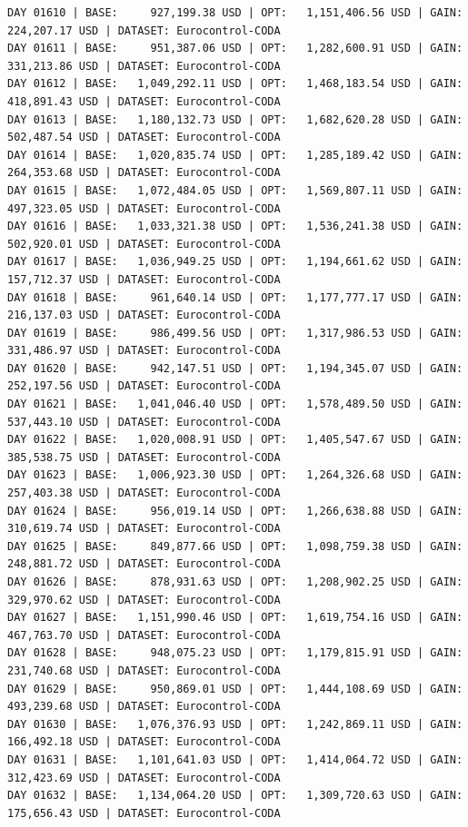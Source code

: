 \documentclass[11pt,a4paper]{article}
\begin{document}
\begin{verbatim}
DAY 01610 | BASE:     927,199.38 USD | OPT:   1,151,406.56 USD | GAIN: 224,207.17 USD | DATASET: Eurocontrol-CODA
DAY 01611 | BASE:     951,387.06 USD | OPT:   1,282,600.91 USD | GAIN: 331,213.86 USD | DATASET: Eurocontrol-CODA
DAY 01612 | BASE:   1,049,292.11 USD | OPT:   1,468,183.54 USD | GAIN: 418,891.43 USD | DATASET: Eurocontrol-CODA
DAY 01613 | BASE:   1,180,132.73 USD | OPT:   1,682,620.28 USD | GAIN: 502,487.54 USD | DATASET: Eurocontrol-CODA
DAY 01614 | BASE:   1,020,835.74 USD | OPT:   1,285,189.42 USD | GAIN: 264,353.68 USD | DATASET: Eurocontrol-CODA
DAY 01615 | BASE:   1,072,484.05 USD | OPT:   1,569,807.11 USD | GAIN: 497,323.05 USD | DATASET: Eurocontrol-CODA
DAY 01616 | BASE:   1,033,321.38 USD | OPT:   1,536,241.38 USD | GAIN: 502,920.01 USD | DATASET: Eurocontrol-CODA
DAY 01617 | BASE:   1,036,949.25 USD | OPT:   1,194,661.62 USD | GAIN: 157,712.37 USD | DATASET: Eurocontrol-CODA
DAY 01618 | BASE:     961,640.14 USD | OPT:   1,177,777.17 USD | GAIN: 216,137.03 USD | DATASET: Eurocontrol-CODA
DAY 01619 | BASE:     986,499.56 USD | OPT:   1,317,986.53 USD | GAIN: 331,486.97 USD | DATASET: Eurocontrol-CODA
DAY 01620 | BASE:     942,147.51 USD | OPT:   1,194,345.07 USD | GAIN: 252,197.56 USD | DATASET: Eurocontrol-CODA
DAY 01621 | BASE:   1,041,046.40 USD | OPT:   1,578,489.50 USD | GAIN: 537,443.10 USD | DATASET: Eurocontrol-CODA
DAY 01622 | BASE:   1,020,008.91 USD | OPT:   1,405,547.67 USD | GAIN: 385,538.75 USD | DATASET: Eurocontrol-CODA
DAY 01623 | BASE:   1,006,923.30 USD | OPT:   1,264,326.68 USD | GAIN: 257,403.38 USD | DATASET: Eurocontrol-CODA
DAY 01624 | BASE:     956,019.14 USD | OPT:   1,266,638.88 USD | GAIN: 310,619.74 USD | DATASET: Eurocontrol-CODA
DAY 01625 | BASE:     849,877.66 USD | OPT:   1,098,759.38 USD | GAIN: 248,881.72 USD | DATASET: Eurocontrol-CODA
DAY 01626 | BASE:     878,931.63 USD | OPT:   1,208,902.25 USD | GAIN: 329,970.62 USD | DATASET: Eurocontrol-CODA
DAY 01627 | BASE:   1,151,990.46 USD | OPT:   1,619,754.16 USD | GAIN: 467,763.70 USD | DATASET: Eurocontrol-CODA
DAY 01628 | BASE:     948,075.23 USD | OPT:   1,179,815.91 USD | GAIN: 231,740.68 USD | DATASET: Eurocontrol-CODA
DAY 01629 | BASE:     950,869.01 USD | OPT:   1,444,108.69 USD | GAIN: 493,239.68 USD | DATASET: Eurocontrol-CODA
DAY 01630 | BASE:   1,076,376.93 USD | OPT:   1,242,869.11 USD | GAIN: 166,492.18 USD | DATASET: Eurocontrol-CODA
DAY 01631 | BASE:   1,101,641.03 USD | OPT:   1,414,064.72 USD | GAIN: 312,423.69 USD | DATASET: Eurocontrol-CODA
DAY 01632 | BASE:   1,134,064.20 USD | OPT:   1,309,720.63 USD | GAIN: 175,656.43 USD | DATASET: Eurocontrol-CODA

\end{verbatim}
\end{document}
